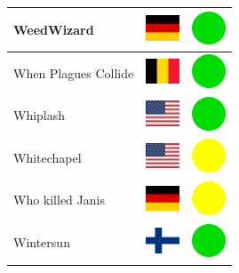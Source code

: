 \documentclass[12pt, a4paper, twoside]{report}
\begin{document}
\begin{center}
\begin{longtable}{|p{5cm}|p{2cm}|p{2cm}|}
 WeedWizard                                                 & \includegraphics[width=1cm]{4x3/de} &   \includegraphics[width=1cm]{likes/y} \\ \hline
 When Plagues Collide                                       & \includegraphics[width=1cm]{4x3/be} &   \includegraphics[width=1cm]{likes/y} \\ \hline
 Whiplash                                                   & \includegraphics[width=1cm]{4x3/us} &   \includegraphics[width=1cm]{likes/y} \\ \hline
 Whitechapel                                                & \includegraphics[width=1cm]{4x3/us} &   \includegraphics[width=1cm]{likes/m} \\ \hline
 Who killed Janis                                           & \includegraphics[width=1cm]{4x3/de} &   \includegraphics[width=1cm]{likes/m} \\ \hline
 Wintersun                                                  & \includegraphics[width=1cm]{4x3/fi} &   \includegraphics[width=1cm]{likes/y} \\ \hline

\end{longtable}
\end{center}
\end{document}
